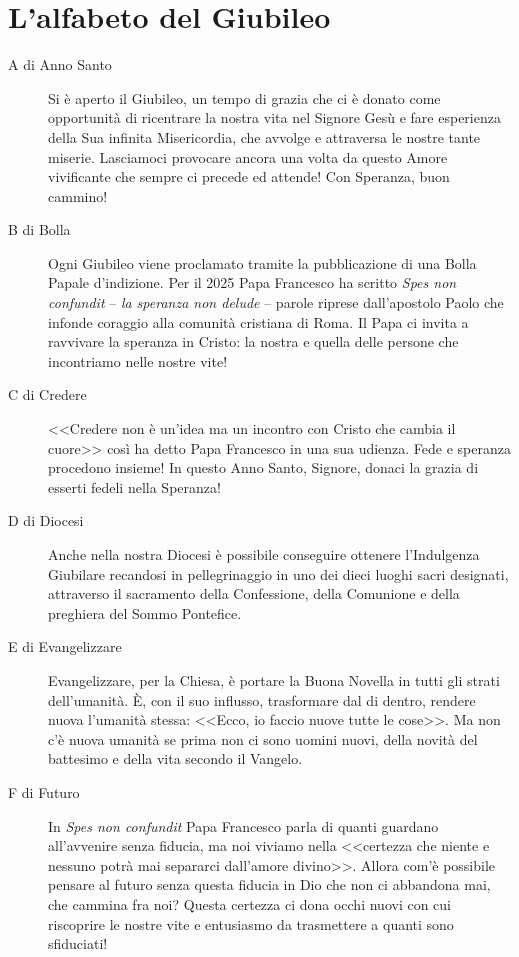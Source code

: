 \section{L'alfabeto del Giubileo}

\begin{description}
  \item[A di Anno Santo] Si è aperto il Giubileo, un tempo di grazia che ci è donato come opportunità di ricentrare la nostra vita nel Signore Gesù e fare esperienza della Sua infinita Misericordia, che avvolge e attraversa le nostre tante miserie. Lasciamoci provocare ancora una volta da questo Amore vivificante che sempre ci precede ed attende! Con Speranza, buon cammino!

  \item[B di Bolla] Ogni Giubileo viene proclamato tramite la pubblicazione di una Bolla Papale d'indizione. Per il 2025 Papa Francesco ha scritto \textit{Spes non confundit} -- \textit{la speranza non delude} -- parole riprese dall'apostolo Paolo che infonde coraggio alla comunità cristiana di Roma. Il Papa ci invita a ravvivare la speranza in Cristo: la nostra e quella delle persone che incontriamo nelle nostre vite!

  \item[C di Credere] <<Credere non è un'idea ma un incontro con Cristo che cambia il cuore>> così ha detto Papa Francesco in una sua udienza. Fede e speranza procedono insieme! In questo Anno Santo, Signore, donaci la grazia di esserti fedeli nella Speranza!

  \item[D di Diocesi] Anche nella nostra Diocesi è possibile conseguire ottenere l'Indulgenza Giubilare recandosi in pellegrinaggio in uno dei dieci luoghi sacri designati, attraverso il sacramento della Confessione, della Comunione e della preghiera del Sommo Pontefice.

  \item[E di Evangelizzare] Evangelizzare, per la Chiesa, è portare la Buona Novella in tutti gli strati dell'umanità. È, con il suo influsso, trasformare dal di dentro, rendere nuova l'umanità stessa: <<Ecco, io faccio nuove tutte le cose>>. Ma non c'è nuova umanità se prima non ci sono uomini nuovi, della novità del battesimo e della vita secondo il Vangelo.

  \item[F di Futuro] In \textit{Spes non confundit} Papa Francesco parla di quanti guardano all'avvenire senza fiducia, ma noi viviamo nella <<certezza che niente e nessuno potrà mai separarci dall'amore divino>>. Allora com'è possibile pensare al futuro senza questa fiducia in Dio che non ci abbandona mai, che cammina fra noi? Questa certezza ci dona occhi nuovi con cui riscoprire le nostre vite e entusiasmo da trasmettere a quanti sono sfiduciati!


\end{description}
